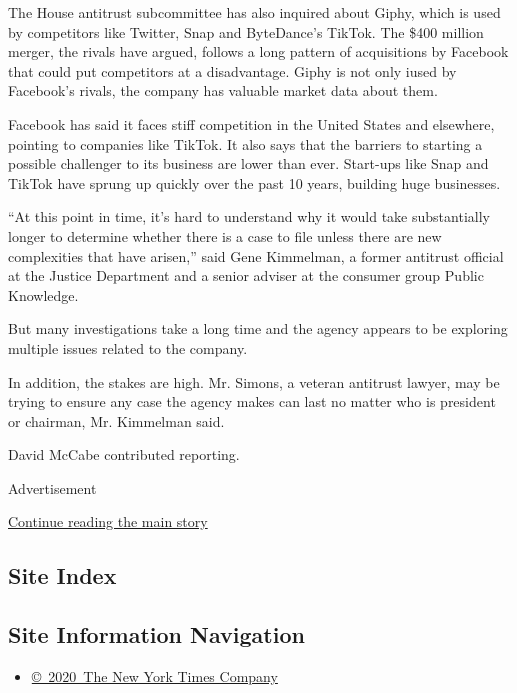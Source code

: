 The House antitrust subcommittee has also inquired about Giphy, which is
used by competitors like Twitter, Snap and ByteDance's TikTok. The \$400
million merger, the rivals have argued, follows a long pattern of
acquisitions by Facebook that could put competitors at a disadvantage.
Giphy is not only iused by Facebook's rivals, the company has valuable
market data about them.

Facebook has said it faces stiff competition in the United States and
elsewhere, pointing to companies like TikTok. It also says that the
barriers to starting a possible challenger to its business are lower
than ever. Start-ups like Snap and TikTok have sprung up quickly over
the past 10 years, building huge businesses.

``At this point in time, it's hard to understand why it would take
substantially longer to determine whether there is a case to file unless
there are new complexities that have arisen,'' said Gene Kimmelman, a
former antitrust official at the Justice Department and a senior adviser
at the consumer group Public Knowledge.

But many investigations take a long time and the agency appears to be
exploring multiple issues related to the company.

In addition, the stakes are high. Mr. Simons, a veteran antitrust
lawyer, may be trying to ensure any case the agency makes can last no
matter who is president or chairman, Mr. Kimmelman said.

David McCabe contributed reporting.

Advertisement

\protect\hyperlink{after-bottom}{Continue reading the main story}

\hypertarget{site-index}{%
\subsection{Site Index}\label{site-index}}

\hypertarget{site-information-navigation}{%
\subsection{Site Information
Navigation}\label{site-information-navigation}}

\begin{itemize}
\tightlist
\item
  \href{https://help.nytimes3xbfgragh.onion/hc/en-us/articles/115014792127-Copyright-notice}{©~2020~The
  New York Times Company}
\end{itemize}

